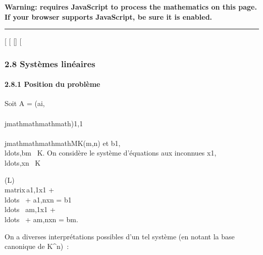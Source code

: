 \textbf{Warning: 
requires JavaScript to process the mathematics on this page.\\ If your
browser supports JavaScript, be sure it is enabled.}

\begin{center}\rule{3in}{0.4pt}\end{center}

{[}
{[}
{[}{]}
{[}

\subsubsection{2.8 Systèmes linéaires}

\paragraph{2.8.1 Position du problème}

Soit A = (ai,\\\\jmathmathmathmath)1\leqi\leqm,1\leq\\\\jmathmathmathmath\leqn \in MK(m,n) et
b1,\\ldots,bm~
\in K. On considère le système d'équations aux inconnues
x1,\\ldots,xn~
\in K

(L)\quad \left
\\matrix\,a1,1x1
+ \\ldots~ +
a1,nxn = b1 \cr
\\ldots~
\cr am,1x1 +
\\ldots~ +
am,nxn = bm\right .

On a diverses interprétations possibles d'un tel système (en notant
\textCann la base canonique de
K^n)~:

